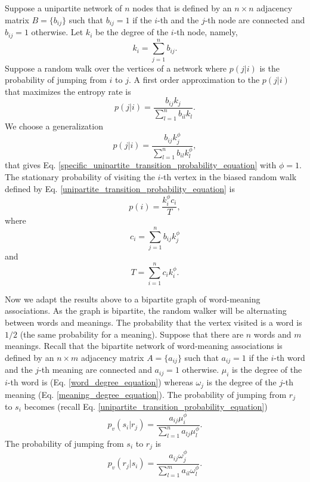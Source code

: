 \documentclass{article}
\begin{document}
Suppose a unipartite network of $n$ nodes that is defined by an $n \times n$ adjacency matrix $B = \{b_{ij}\}$ such that 
$b_{ij} = 1$ if the $i$-th and the $j$-th node are connected and $b_{ij} = 1$ otherwise. Let 
$k_i$ be the degree of the $i$-th node, namely, 
\begin{equation*}
k_i = \sum_{j = 1}^n b_{ij}.
\end{equation*}
Suppose a random walk over the vertices of a network where $p(j | i)$ is the probability of jumping from $i$ to $j$. A first order approximation to the $p(j | i)$ that maximizes the entropy rate is \cite{Sinatra2011a}
\begin{equation}
p(j | i) = \frac{b_{ij} k_j}{\sum_{l=1}^n b_{il} k_l}.
\label{specific_unipartite_transition_probability_equation}
\end{equation}
We choose a generalization \cite{Gomez-Gardenes2008a} 
\begin{equation}
p(j | i) = \frac{b_{ij} k_j^\phi}{\sum_{l=1}^n b_{il} k_l^\phi},
\label{unipartite_transition_probability_equation}
\end{equation}
that gives Eq. \ref{specific_unipartite_transition_probability_equation} with $\phi = 1$.
The stationary probability of visiting the $i$-th vertex in the biased random walk defined by Eq. \ref{unipartite_transition_probability_equation} is \cite{Gomez-Gardenes2008a}
\begin{equation}
p(i) = \frac{k_i^\phi c_i}{T},
\label{uniparite_stationarty_probability_equation}
\end{equation}
where
\begin{equation}
c_i = \sum_{j=1}^n b_{ij}k_j^\phi
\label{unipartite_subweight_equation}
\end{equation} 
and
\begin{equation}
T = \sum_{i = 1}^n c_i k_i^\phi.
\label{unipartite_total_equation}
\end{equation}

Now we adapt the results above to a bipartite graph of word-meaning associations. As the graph is bipartite, the random walker will be alternating between words and meanings. The probability that the vertex visited is a word is $1/2$ (the same probability for a meaning).
Suppose that there are $n$ words and $m$ meanings. Recall that the bipartite network of word-meaning associations is defined by an $n \times m$ adjacency matrix $A = \{a_{ij}\}$ such that 
$a_{ij} = 1$ if the $i$-th word and the $j$-th meaning are connected and $a_{ij} = 1$ otherwise. 
$\mu_i$ is the degree of the $i$-th word is (Eq. \ref{word_degree_equation}) whereas $\omega_j$ is the degree of the $j$-th meaning (Eq. \ref{meaning_degree_equation}). 
The probability of jumping from $r_j$ to $s_i$ becomes (recall Eq. \ref{unipartite_transition_probability_equation}) 
\begin{equation*}
p_{v}(s_i |r_j) = \frac{a_{ij}\mu_i^\phi}{\sum_{l = 1}^n a_{lj}\mu_{l}^\phi}.
\end{equation*}
The probability of jumping from $s_i$ to $r_j$ is
\begin{equation}
p_{v}(r_j |s_i) = \frac{a_{ij}\omega_j^\phi}{\sum_{l = 1}^m a_{il}\omega_{l}^\phi}.
\label{conditional_meaning_probability_random_walk_equation}
\end{equation}
\end{document}
